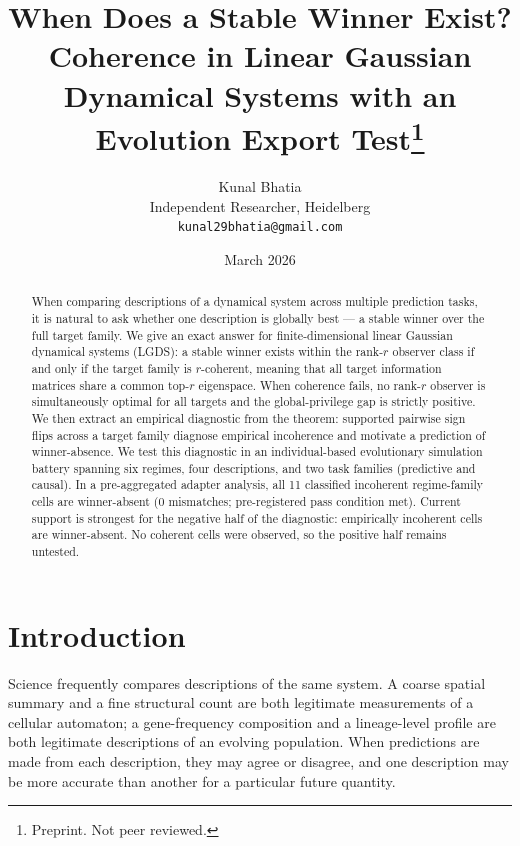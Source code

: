 \documentclass[11pt]{article}
\title{When Does a Stable Winner Exist? Coherence in Linear Gaussian
Dynamical Systems with an Evolution Export Test\thanks{Preprint.
Not peer reviewed.}}
\author{Kunal Bhatia\\
Independent Researcher, Heidelberg\\
\texttt{kunal29bhatia@gmail.com}}
\date{March 2026}
\begin{document}
\maketitle


\begin{abstract}
When comparing descriptions of a dynamical system across multiple prediction
tasks, it is natural to ask whether one description is globally best ---
a stable winner over the full target family.
We give an exact answer for finite-dimensional linear Gaussian dynamical
systems (LGDS): a stable winner exists within the rank-$r$ observer class
if and only if the target family is $r$-coherent, meaning that all target
information matrices share a common top-$r$ eigenspace.
When coherence fails, no rank-$r$ observer is simultaneously optimal for
all targets and the global-privilege gap is strictly positive.
We then extract an empirical diagnostic from the theorem:
supported pairwise sign flips across a target family diagnose empirical
incoherence and motivate a prediction of winner-absence.
We test this diagnostic in an individual-based evolutionary simulation
battery spanning six regimes, four descriptions, and two task families
(predictive and causal).
In a pre-aggregated adapter analysis, all 11 classified incoherent
regime-family cells are winner-absent (0 mismatches; pre-registered
pass condition met).
Current support is strongest for the negative half of the diagnostic:
empirically incoherent cells are winner-absent.
No coherent cells were observed, so the positive half remains untested.
\end{abstract}


\section{Introduction}

Science frequently compares descriptions of the same system.
A coarse spatial summary and a fine structural count are both legitimate
measurements of a cellular automaton;
a gene-frequency composition and a lineage-level profile are both legitimate
descriptions of an evolving population.
When predictions are made from each description, they may agree or disagree,
and one description may be more accurate than another for a particular
future quantity.
\end{document}
